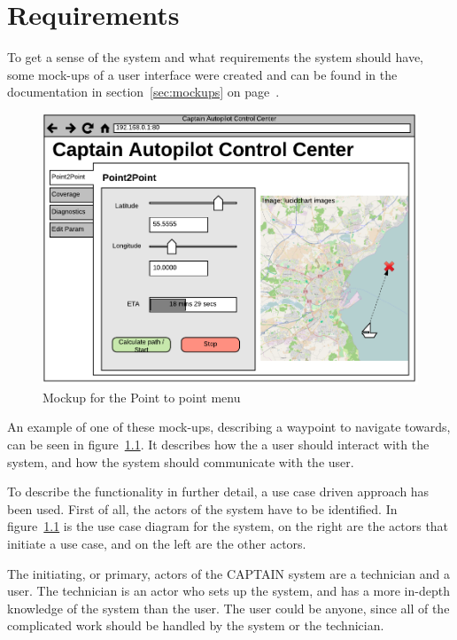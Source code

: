 \newpage
\chapter{Requirements}
To get a sense of the system and what requirements the system should have, some mock-ups of a user interface were created and can be found in the documentation in section~\ref{sec:mockups} on page~\pageref{sec:mockups}.

\begin{figure}[H]
\centering
\includegraphics[width=0.7\linewidth]{../Appendix/Project/Dokumentation/Images/Requirements_specification/UI_Mockup_Point_to_point}
\caption{Mockup for the Point to point menu}
\label{fig:uimockuppointtopoint}
\end{figure}

An example of one of these mock-ups, describing a waypoint to navigate towards, can be seen in figure~\ref{fig:uimockuppointtopoint}. It describes how the a user should interact with the system, and how the system should communicate with the user.

To describe the functionality in further detail, a use case driven approach has been used. First of all, the actors of the system have to be identified. In figure~\ref{fig:uimockuppointtopoint} is the use case diagram for the system, on the right are the actors that initiate a use case, and on the left are the other actors.

The initiating, or primary, actors of the CAPTAIN system are a technician and a user. The technician is an actor who sets up the system, and has a more in-depth knowledge of the system than the user. The user could be anyone, since all of the complicated work should be handled by the system or the technician. 

